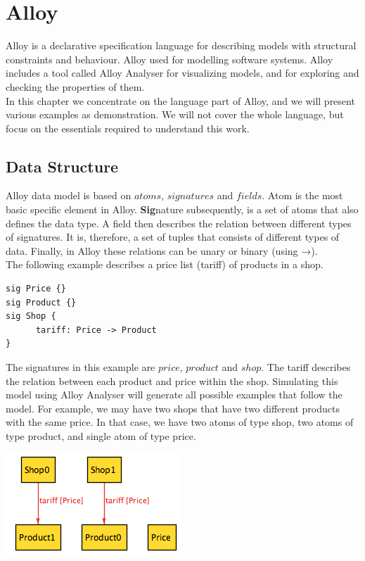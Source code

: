 \documentclass[oneside]{book}
\begin{document}
\newpage

\chapter{Alloy}

Alloy is a declarative specification language for describing models with structural constraints and behaviour. Alloy used for modelling software systems. Alloy includes a tool called Alloy Analyser for visualizing models, and for exploring and checking the properties of them.\\

In this chapter we concentrate on the language part of Alloy, and we will present various examples as demonstration. We will not cover the whole language, but focus on the essentials required to understand this work.\\

\section{Data Structure}

Alloy data model is based on $atoms$, $signatures$ and $fields$. Atom is the most basic specific element in Alloy. \textbf{Sig}nature subsequently, is a set of atoms that also defines the data type. A field then describes the relation between different types of signatures. It is, therefore, a set of tuples that consists of different types of data. Finally, in Alloy these relations can be unary or binary (using →).\\

The following example describes a price list (tariff) of products in a shop. 

\begin{lstlisting}
sig Price {}
sig Product {}
sig Shop {
	  tariff: Price -> Product
}
\end{lstlisting}

The signatures in this example are $price$, $product$ and $shop$. The tariff describes the relation between each product and price within the shop. Simulating this model using Alloy Analyser will generate all possible examples that follow the model. For example, we may have two shops that have two different products with the same price. In that case, we have two atoms of type shop, two atoms of type product, and single atom of type price.

\begin{center}
\includegraphics[scale=0.6]{shops1}
\end{center}
\end{document}
